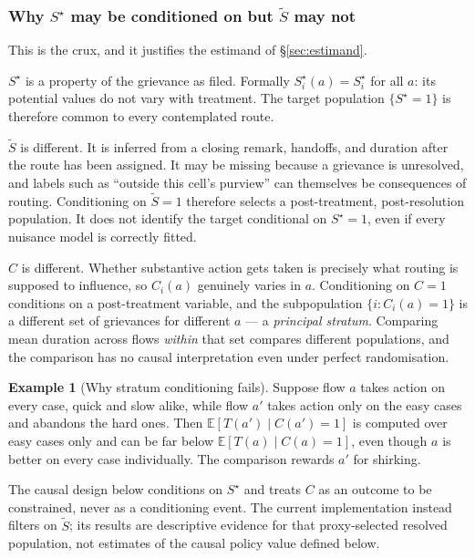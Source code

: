 \documentclass[11pt,a4paper]{article}
\theoremstyle{plain}
\theoremstyle{definition}
\newtheorem{example}[theorem]{Example}
\theoremstyle{remark}
\newcommand{\E}{\mathbb E}
\newcommand{\Sstar}{S^{\star}}
\newcommand{\Sproxy}{\widetilde S}
\begin{document}
\subsubsection{Why \texorpdfstring{$\Sstar$}{S*} may be conditioned on but
\texorpdfstring{$\Sproxy$}{S-tilde} may not}\label{sec:S-pretreatment}

This is the crux, and it justifies the estimand of \S\ref{sec:estimand}.

$\Sstar$ is a property of the grievance as filed. Formally
$\Sstar_i(a)=\Sstar_i$ for all $a$: its potential values do not vary with treatment. The target
population $\{\Sstar=1\}$ is therefore common to every contemplated route.

$\Sproxy$ is different. It is inferred from a closing remark, handoffs, and duration after the
route has been assigned. It may be missing because a grievance is unresolved, and labels such
as ``outside this cell's purview'' can themselves be consequences of routing. Conditioning on
$\Sproxy=1$ therefore selects a post-treatment, post-resolution population. It does not identify
the target conditional on $\Sstar=1$, even if every nuisance model is correctly fitted.

$C$ is different. Whether substantive action gets taken is precisely what routing is supposed to
influence, so $C_i(a)$ genuinely varies in $a$. Conditioning on $C=1$ conditions on a
post-treatment variable, and the subpopulation $\{i:C_i(a)=1\}$ is a different set of grievances
for different $a$ --- a \emph{principal stratum}. Comparing mean duration across flows
\emph{within} that set compares different populations, and the comparison has no causal
interpretation even under perfect randomisation.

\begin{example}[Why stratum conditioning fails]\label{ex:stratum}
Suppose flow $a$ takes action on every case, quick and slow alike, while flow $a'$ takes action
only on the easy cases and abandons the hard ones. Then $\E[T(a')\mid C(a')=1]$ is computed over
easy cases only and can be far below $\E[T(a)\mid C(a)=1]$, even though $a$ is better on every
case individually. The comparison rewards $a'$ for shirking.
\end{example}

The causal design below conditions on $\Sstar$ and treats $C$ as an outcome to be constrained,
never as a conditioning event. The current implementation instead filters on $\Sproxy$; its
results are descriptive evidence for that proxy-selected resolved population, not estimates of
the causal policy value defined below.
\end{document}
